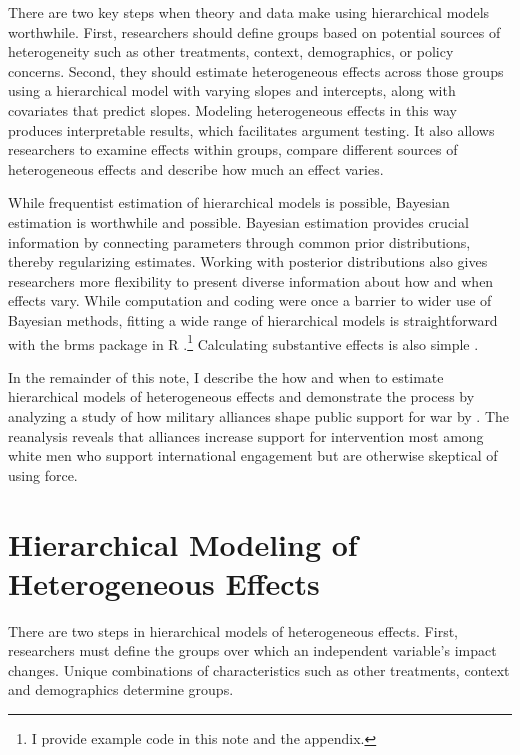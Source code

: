 \documentclass[12pt]{article}
\begin{document}
There are two key steps when theory and data make using hierarchical models worthwhile.
First, researchers should define groups based on potential sources of heterogeneity such as other treatments, context, demographics, or policy concerns. 
Second, they should estimate heterogeneous effects across those groups using a hierarchical model with varying slopes and intercepts, along with covariates that predict slopes.
Modeling heterogeneous effects in this way produces interpretable results, which facilitates argument testing.
It also allows researchers to examine effects within groups, compare different sources of heterogeneous effects and describe how much an effect varies.  


While frequentist estimation of hierarchical models is possible, Bayesian estimation is worthwhile and possible. 
Bayesian estimation provides crucial information by connecting parameters through common prior distributions, thereby regularizing estimates. 
Working with posterior distributions also gives researchers more flexibility to present diverse information about how and when effects vary. 
While computation and coding were once a barrier to wider use of Bayesian methods, fitting a wide range of hierarchical models is straightforward with the brms package in \textsf{R} \citep{Buerkner2017}.\footnote{I provide example code in this note and the appendix.}
Calculating substantive effects is also simple \citep{ArelBundockme}.



In the remainder of this note, I describe the how and when to estimate hierarchical models of heterogeneous effects and demonstrate the process by analyzing a study of how military alliances shape public support for war by \citet{TomzWeeks2021}. 
The reanalysis reveals that alliances increase support for intervention most among white men who support international engagement but are otherwise skeptical of using force. 



\section{Hierarchical Modeling of Heterogeneous Effects}


There are two steps in hierarchical models of heterogeneous effects. 
First, researchers must define the groups over which an independent variable's impact changes. 
Unique combinations of characteristics such as other treatments, context and demographics determine groups.
\end{document}
